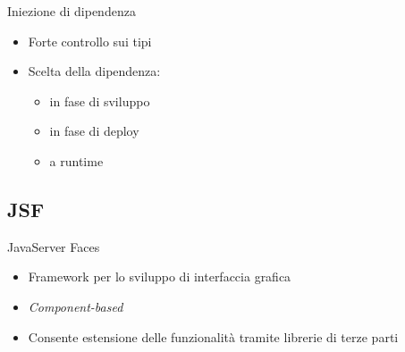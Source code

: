 \begin{frame}{Iniezione di dipendenza}

\begin{itemize}
\item Forte controllo sui tipi

\vspace{1em}

\item Scelta della dipendenza:

	\begin{itemize}
	
	\vspace{0.5em}
	
	\item in fase di sviluppo
	
	\vspace{0.8em}
	
	\item in fase di deploy
	
	\vspace{0.8em}
	
	\item a runtime
	
	\end{itemize}



\end{itemize}

\end{frame}


\subsection{JSF}

\begin{frame}{JavaServer Faces}

\begin{itemize}
\item Framework per lo sviluppo di interfaccia grafica

\vspace{0.8em}

\item \textsl{Component-based}

\vspace{0.8em}

\item Consente estensione delle funzionalità tramite librerie di terze parti
\end{itemize}

\end{frame}


